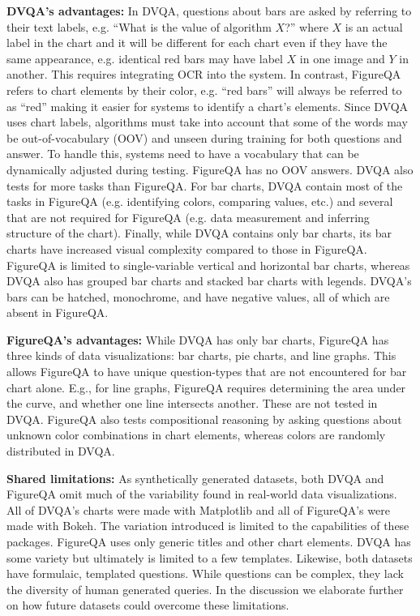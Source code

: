 \documentclass[10pt,twocolumn]{article}
\begin{document}
\textbf{DVQA's advantages:} In DVQA, questions about bars  are asked by referring to their text labels, e.g. ``What is the value of algorithm $X$?'' where $X$ is an actual label in the chart and it will be different for each chart even if they have the same appearance, e.g. identical red bars may have label $X$ in one image and $Y$ in another. This requires integrating OCR into the system. In contrast, FigureQA refers to chart elements by their color, e.g. ``red bars'' will always be referred to as ``red'' making it easier for systems to identify a chart's elements. Since DVQA uses chart labels, algorithms must take into account that some of the words may be out-of-vocabulary (OOV) and unseen during training for both questions and answer. To handle this, systems need to have a vocabulary that can be dynamically adjusted during testing. FigureQA has no OOV answers. DVQA also tests for more tasks than FigureQA. For bar charts, DVQA contain most of the tasks in FigureQA (e.g. identifying colors, comparing values, etc.) and several that are not required for FigureQA (e.g. data measurement and inferring structure of the chart). Finally, while DVQA contains only bar charts, its bar charts have increased visual complexity compared to those in FigureQA. FigureQA is limited to single-variable vertical and horizontal bar charts, whereas DVQA also has grouped bar charts and stacked bar charts with legends. DVQA's bars can be hatched, monochrome, and have negative values, all of which are absent in FigureQA.

\textbf{FigureQA's advantages:} While DVQA has only bar charts, FigureQA has three kinds of data visualizations: bar charts, pie charts, and line graphs. This allows FigureQA to have unique question-types that are not encountered for bar chart alone. E.g., for line graphs, FigureQA requires determining the area under the curve, and whether one line intersects another. These are not tested in DVQA. FigureQA also tests compositional reasoning by asking questions about unknown color combinations in chart elements, whereas colors are randomly distributed in DVQA.


\textbf{Shared limitations:} As synthetically generated datasets, both DVQA and FigureQA omit much of the variability found in real-world data visualizations. All of DVQA's charts were made with Matplotlib  and all of FigureQA's were made with Bokeh. The variation introduced is limited to the capabilities of these packages. FigureQA uses only generic titles and other chart elements. DVQA has some variety but ultimately is limited to a few templates. Likewise, both datasets have formulaic, templated questions. While questions can be complex, they lack the diversity of human generated queries. In the discussion we elaborate further on how future datasets could overcome these limitations. 
\end{document}
